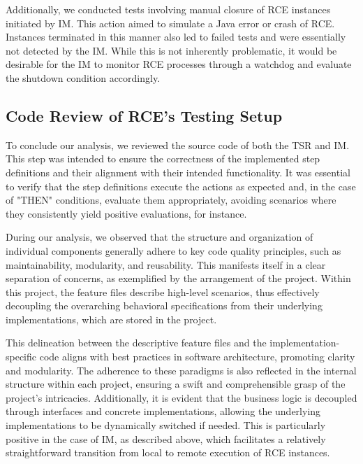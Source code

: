 Additionally, we conducted tests involving manual closure of \ac{RCE} instances initiated by \ac{IM}. This action aimed to simulate a Java error or crash of \ac{RCE}. Instances terminated in this manner also led to failed tests and were essentially not detected by the \ac{IM}. While this is not inherently problematic, it would be desirable for the \ac{IM} to monitor \ac{RCE} processes through a watchdog and evaluate the shutdown condition accordingly.

\subsection{Code Review of \ac{RCE}'s Testing Setup}
\label{subsec:CodeReview}
To conclude our analysis, we reviewed the source code of both the \ac{TSR} and \ac{IM}. This step was intended to ensure the correctness of the implemented step definitions and their alignment with their intended functionality. It was essential to verify that the step definitions execute the actions as expected and, in the case of "THEN" conditions, evaluate them appropriately, avoiding scenarios where they consistently yield positive evaluations, for instance.

During our analysis, we observed that the structure and organization of individual components generally adhere to key code quality principles, such as maintainability, modularity, and reusability. This manifests itself in a clear separation of concerns, as exemplified by the arrangement of the \textit{} project. Within this project, the feature files describe high-level scenarios, thus effectively decoupling the overarching behavioral specifications from their underlying implementations, which are stored in the \textit{} project. 

This delineation between the descriptive feature files and the implementation-specific code aligns with best practices in software architecture, promoting clarity and modularity. The adherence to these paradigms is also reflected in the internal structure within each project, ensuring a swift and comprehensible grasp of the project's intricacies. Additionally, it is evident that the business logic is decoupled through interfaces and concrete implementations, allowing the underlying implementations to be dynamically switched if needed. This is particularly positive in the case of \ac{IM}, as described above, which facilitates a relatively straightforward transition from local to remote execution of \ac{RCE} instances. 

